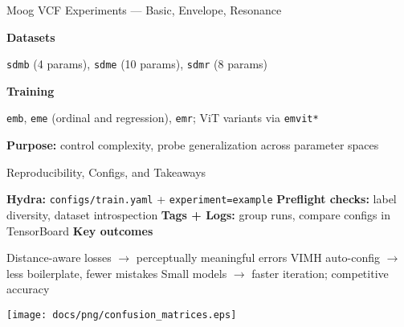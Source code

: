 \begin{slide}[\slideopts,toc={Moog VCF}]{Moog VCF Experiments --- Basic, Envelope, Resonance}
  \vspace{-0.75em}
  \begin{itemize}
    \mpitem \textbf{Datasets}
    \vspace{-0.25em}
    \begin{itemize}
      \mpitem \texttt{sdmb} (4 params), \texttt{sdme} (10 params), \texttt{sdmr} (8 params)
    \end{itemize}
    \mpitem \textbf{Training}
    \vspace{-0.25em}
    \begin{itemize}
      \mpitem \texttt{emb}, \texttt{eme} (ordinal and regression), \texttt{emr}; ViT variants via \texttt{emvit*}
    \end{itemize}
    \mpitem \textbf{Purpose:} control complexity, probe generalization across parameter spaces
  \end{itemize}
  \vspace{0.25em}
  \begin{center}
    \setlength{\fboxsep}{4pt}
  \end{center}
\end{slide}

\begin{slide}[\slideopts,toc={Reproducibility}]{Reproducibility, Configs, and Takeaways}
  \vspace{-0.75em}
  \begin{itemize}
    \mpitem \textbf{Hydra:} \texttt{configs/train.yaml} + \texttt{experiment=example}
    \mpitem \textbf{Preflight checks:} label diversity, dataset introspection
    \mpitem \textbf{Tags + Logs:} group runs, compare configs in TensorBoard
    \mpitem \textbf{Key outcomes}
    \vspace{-0.25em}
    \begin{itemize}
      \mpitem Distance-aware losses $\to$ perceptually meaningful errors
      \mpitem VIMH auto-config $\to$ less boilerplate, fewer mistakes
      \mpitem Small models $\to$ faster iteration; competitive accuracy
    \end{itemize}
  \end{itemize}
  \vspace{0.25em}
  \begin{center}
    \texttt{[image: docs/png/confusion\_matrices.eps]}
  \end{center}
\end{slide}

